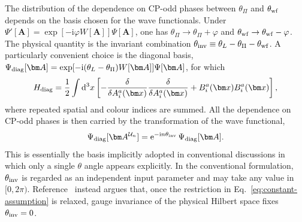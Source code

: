 \documentclass[review]{elsarticle}
\numberwithin{equation}{section}
\numberwithin{table}{section}
\numberwithin{figure}{section}
\def\d{\mathrm{d}}
\def\i{\mathrm{i}}
\def\e{\mathrm{e}}
\begin{document}
The distribution of the dependence on CP-odd
phases between $\theta_\Pi$ and $\theta_{\rm wf}$ depends on the basis chosen for the wave functionals. Under $\Psi'[\bm A]=\exp[-\i\varphi W[\bm A]]\Psi[\bm A]$, one has $\theta_\Pi\to\theta_\Pi+\varphi$ and $\theta_{\rm wf}\to\theta_{\rm wf}-\varphi$. The physical quantity is the invariant combination $\theta_{\rm inv}\equiv\theta_L-\theta_\Pi-\theta_{\rm wf}$. A particularly convenient choice is the diagonal basis, $\Psi_{\rm diag}[\bm A]=\exp[-\i(\theta_L-\theta_\Pi)W[\bm A]]\Psi[\bm A]$, for which
\begin{align}
H_{\rm diag}=\frac{1}{2}\int\d^3x\left[-\frac{\delta}{\delta A_i^a(\bm x)}\frac{\delta}{\delta A_i^a(\bm x)}+B_i^a(\bm x)B_i^a(\bm x)\right],
\label{eq:canonical-Hamiltonian-diagonal}
\end{align}
where repeated spatial and colour indices are summed. All  the dependence on CP-odd phases is then carried by the transformation of the wave functional, 
\begin{align}
\label{eq:tranf-invariant-angle}
  \Psi_{\rm diag}[\bm A^{\mathcal U_n}]=\e^{-\i n\theta_{\rm inv}}\,\Psi_{\rm diag}[\bm A]. 
\end{align}
This is essentially the basis implicitly adopted in conventional discussions in which only a single $\theta$ angle appears explicitly. In the conventional formulation, $\theta_{\rm inv}$ is regarded as an independent input parameter and may take any value in $[0,2\pi)$. Reference~\cite{Ai:2024vfa} instead argues that, once the restriction in Eq.~\eqref{eq:constant-assumption} is relaxed, gauge invariance of the physical Hilbert space fixes $\theta_{\rm inv}=0$.
\end{document}
